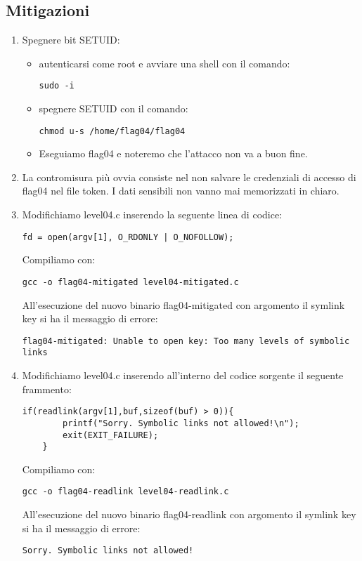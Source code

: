 \subsection{Mitigazioni}
\begin{enumerate}
    \item Spegnere bit SETUID:
    \begin{itemize}
        \item autenticarsi come root e avviare una shell con il comando: \begin{lstlisting}[style=bashstyle] 
        sudo -i
        \end{lstlisting}
        \item spegnere SETUID con il comando: \begin{lstlisting}[style=bashstyle] 
        chmod u-s /home/flag04/flag04
        \end{lstlisting}   
        \item Eseguiamo flag04 e noteremo che l’attacco non va a buon fine. 
    \end{itemize}
    \item La contromisura più ovvia consiste nel non salvare le credenziali di accesso di flag04 nel file token. I dati sensibili non vanno mai memorizzati in chiaro.
    \item Modifichiamo level04.c inserendo la seguente linea di codice:
    \begin{lstlisting}[style=cstyle]
    fd = open(argv[1], O_RDONLY | O_NOFOLLOW);
    \end{lstlisting}
    Compiliamo con:
    \begin{lstlisting}[style=bashstyle]
    gcc -o flag04-mitigated level04-mitigated.c
    \end{lstlisting}
    All'esecuzione del nuovo binario flag04-mitigated con argomento il symlink key si ha il messaggio di errore:
    \begin{lstlisting}[style=bashstyle]
    flag04-mitigated: Unable to open key: Too many levels of symbolic links
    \end{lstlisting} 
    \item Modifichiamo level04.c inserendo all'interno del codice sorgente il seguente frammento: 
    \begin{lstlisting}[style=cstyle]
    if(readlink(argv[1],buf,sizeof(buf) > 0)){
        printf("Sorry. Symbolic links not allowed!\n");
        exit(EXIT_FAILURE); 
    }
    \end{lstlisting} 
    Compiliamo con:
    \begin{lstlisting}[style=bashstyle]
    gcc -o flag04-readlink level04-readlink.c
    \end{lstlisting}
    All'esecuzione del nuovo binario flag04-readlink con argomento il symlink key si ha il messaggio di errore:
    \begin{lstlisting}[style=bashstyle]
    Sorry. Symbolic links not allowed!
    \end{lstlisting} 
\end{enumerate}

